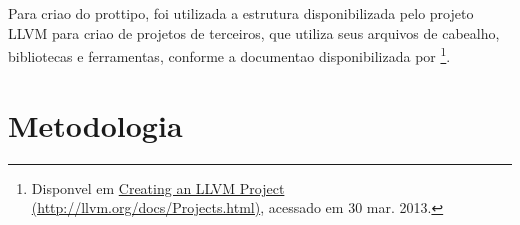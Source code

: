 Para cria\ca o do prot\oh tipo, foi utilizada a estrutura disponibilizada pelo projeto LLVM para cria\ca o de projetos de terceiros, que utiliza seus arquivos de cabe\cc alho, bibliotecas e ferramentas, conforme a documenta\ca o disponibilizada por \cite{LLVMorg}\footnote{Dispon\ih vel em \href{http://llvm.org/docs/Projects.html}{Creating an LLVM Project (http://llvm.org/docs/Projects.html)}, acessado em 30 mar. 2013.}.


\section{Metodologia}











